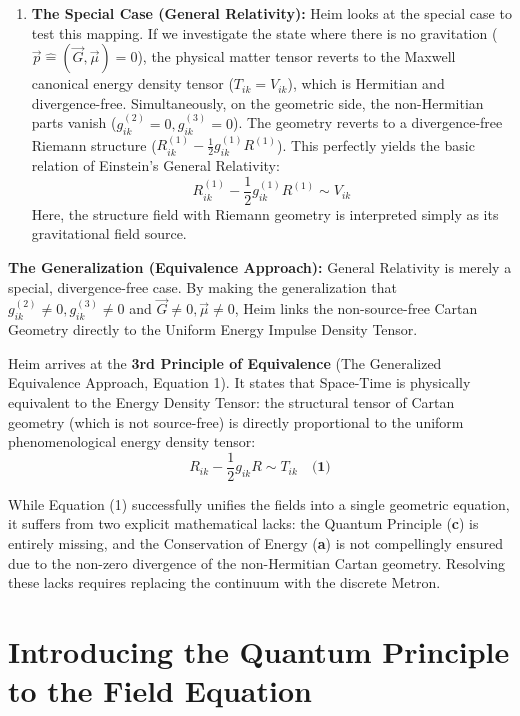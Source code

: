 \documentclass[11pt,a4paper,oneside]{article}
\begin{document}
\begin{enumerate}
    \item \textbf{The Special Case (General Relativity):} Heim looks at the special case to test this mapping. If we investigate the state where there is no gravitation ($\vec{p} \hat{=} (\vec{G}, \vec{\mu}) = 0$), the physical matter tensor reverts to the Maxwell canonical energy density tensor ($T_{ik} = V_{ik}$), which is Hermitian and divergence-free. 
    Simultaneously, on the geometric side, the non-Hermitian parts vanish ($g_{ik}^{(2)} = 0, g_{ik}^{(3)} = 0$). The geometry reverts to a divergence-free Riemann structure ($R_{ik}^{(1)} - \frac{1}{2}g_{ik}^{(1)}R^{(1)}$). This perfectly yields the basic relation of Einstein's General Relativity:
    \begin{equation}
        R_{ik}^{(1)} - \frac{1}{2}g_{ik}^{(1)}R^{(1)} \sim V_{ik}
    \end{equation}
    Here, the structure field with Riemann geometry is interpreted simply as its gravitational field source.
\end{enumerate}

\textbf{The Generalization (Equivalence Approach):} 
General Relativity is merely a special, divergence-free case. By making the generalization that $g_{ik}^{(2)} \neq 0, g_{ik}^{(3)} \neq 0$ and $\vec{G} \neq 0, \vec{\mu} \neq 0$, Heim links the non-source-free Cartan Geometry directly to the Uniform Energy Impulse Density Tensor. 

Heim arrives at the \textbf{3rd Principle of Equivalence} (The Generalized Equivalence Approach, Equation 1). It states that Space-Time is physically equivalent to the Energy Density Tensor: the structural tensor of Cartan geometry (which is not source-free) is directly proportional to the uniform phenomenological energy density tensor:
\begin{equation}
    R_{ik} - \frac{1}{2}g_{ik}R \sim T_{ik} \quad \textbf{(1)}
\end{equation}

While Equation (1) successfully unifies the fields into a single geometric equation, it suffers from two explicit mathematical lacks: the Quantum Principle (\textbf{c}) is entirely missing, and the Conservation of Energy (\textbf{a}) is not compellingly ensured due to the non-zero divergence of the non-Hermitian Cartan geometry. Resolving these lacks requires replacing the continuum with the discrete Metron. 

\section{Introducing the Quantum Principle to the Field Equation}
\end{document}
